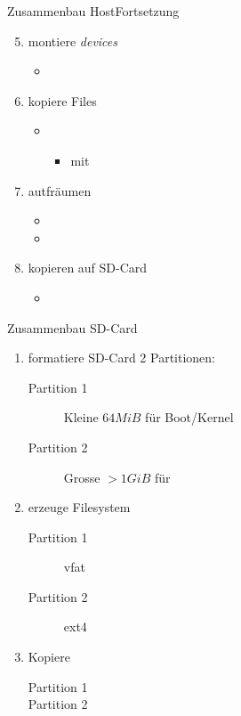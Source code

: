 \begin{frame}{Zusammenbau Host}{Fortsetzung}
\begin{enumerate}
  \setcounter{enumi}{4}
 \item montiere {\em devices}  
 \begin{itemize}
  \item {}
 \end{itemize}
 \item kopiere Files 
 \begin{itemize}
  \item {}
  \begin{itemize}
   \item mit 
  \end{itemize}
 \end{itemize}
 \item autfräumen
 \begin{itemize}
  \item {}
  \item {}
 \end{itemize}
 \item kopieren auf SD-Card
 \begin{itemize}
  \item {}
 \end{itemize}
\end{enumerate}
\end{frame}

\begin{frame}{Zusammenbau SD-Card}
 \begin{enumerate}
  \item formatiere SD-Card 2 Partitionen:
  \begin{description}
   \item[Partition 1] Kleine $64MiB$ für Boot/Kernel
   \item[Partition 2] Grosse $>1GiB$ für \unix
  \end{description}
  \item erzeuge Filesystem 
  \begin{description}
   \item[Partition 1] vfat
   \item[Partition 2] ext4
  \end{description}
  \item Kopiere 
  \begin{description}
   \item[Partition 1] 
   \item[Partition 2] 
  \end{description}
 \end{enumerate}
\end{frame}
